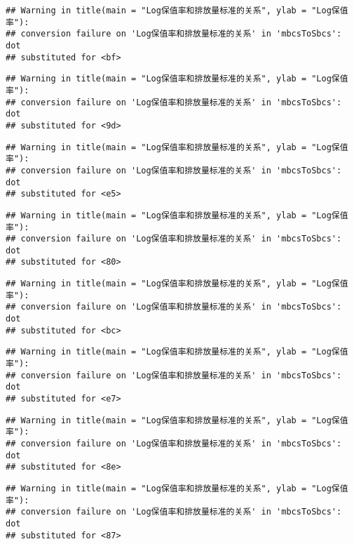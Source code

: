 \documentclass[]{article}
\begin{document}
\begin{verbatim}
## Warning in title(main = "Log保值率和排放量标准的关系", ylab = "Log保值率"):
## conversion failure on 'Log保值率和排放量标准的关系' in 'mbcsToSbcs': dot
## substituted for <bf>
\end{verbatim}

\begin{verbatim}
## Warning in title(main = "Log保值率和排放量标准的关系", ylab = "Log保值率"):
## conversion failure on 'Log保值率和排放量标准的关系' in 'mbcsToSbcs': dot
## substituted for <9d>
\end{verbatim}

\begin{verbatim}
## Warning in title(main = "Log保值率和排放量标准的关系", ylab = "Log保值率"):
## conversion failure on 'Log保值率和排放量标准的关系' in 'mbcsToSbcs': dot
## substituted for <e5>
\end{verbatim}

\begin{verbatim}
## Warning in title(main = "Log保值率和排放量标准的关系", ylab = "Log保值率"):
## conversion failure on 'Log保值率和排放量标准的关系' in 'mbcsToSbcs': dot
## substituted for <80>
\end{verbatim}

\begin{verbatim}
## Warning in title(main = "Log保值率和排放量标准的关系", ylab = "Log保值率"):
## conversion failure on 'Log保值率和排放量标准的关系' in 'mbcsToSbcs': dot
## substituted for <bc>
\end{verbatim}

\begin{verbatim}
## Warning in title(main = "Log保值率和排放量标准的关系", ylab = "Log保值率"):
## conversion failure on 'Log保值率和排放量标准的关系' in 'mbcsToSbcs': dot
## substituted for <e7>
\end{verbatim}

\begin{verbatim}
## Warning in title(main = "Log保值率和排放量标准的关系", ylab = "Log保值率"):
## conversion failure on 'Log保值率和排放量标准的关系' in 'mbcsToSbcs': dot
## substituted for <8e>
\end{verbatim}

\begin{verbatim}
## Warning in title(main = "Log保值率和排放量标准的关系", ylab = "Log保值率"):
## conversion failure on 'Log保值率和排放量标准的关系' in 'mbcsToSbcs': dot
## substituted for <87>
\end{verbatim}
\end{document}
